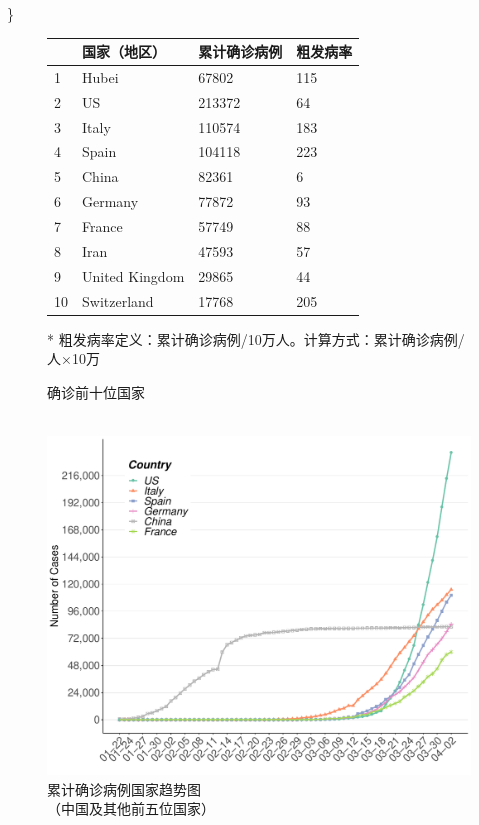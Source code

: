 \documentclass[]{article}
\begin{document}
\}

\begin{figure}[H]
    \begin{minipage}[H]{0.5\linewidth}
    \centering
    \begin{threeparttable}
        \begin{tabular}{@{}llll@{}}
        \toprule
           & 国家（地区）         & 累计确诊病例 & 粗发病率 \\ \midrule
        1  & Hubei          & 67802  & 115  \\
        2  & US             & 213372 & 64   \\
        3  & Italy          & 110574 & 183  \\
        4  & Spain          & 104118 & 223  \\
        5  & China          & 82361  & 6    \\
        6  & Germany        & 77872  & 93   \\
        7  & France         & 57749  & 88   \\
        8  & Iran           & 47593  & 57   \\
        9  & United Kingdom & 29865  & 44   \\
        10 & Switzerland    & 17768  & 205  \\ \bottomrule
        \end{tabular}
        \begin{tablenotes}
        \footnotesize
        \item[*] 粗发病率定义：累计确诊病例/10万人。计算方式：累计确诊病例/⼈×10万  %
      \end{tablenotes}
    \end{threeparttable}
        \makeatletter{}\makeatother\caption{确诊前十位国家\\ \ }
    \end{minipage}%
    \begin{minipage}[H]{0.5\linewidth}
    \centering
    \includegraphics[]{./input/table_plot/covid2.pdf}
    \caption{累计确诊病例国家趋势图\\（中国及其他前五位国家）}
    \end{minipage}
\end{figure}
\end{document}

